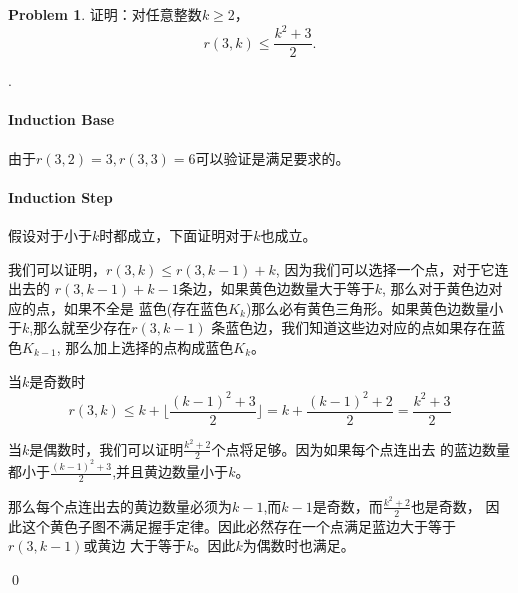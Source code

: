 \documentclass[UTF8]{ctexart}
\newenvironment{sol}
  {\par\vspace{3mm}\noindent{\it Solution}.}
  {\qed \\ \medskip}
\theoremstyle{definition}
\newtheorem{problem}{Problem}
\begin{document}
\begin{problem}
证明：对任意整数$k \geq 2$，
\[
r(3, k) \leq \frac{k^2+3}{2}.
\]
\begin{sol}
  \paragraph{Induction Base} 由于$r(3,2)=3,r(3,3)=6$可以验证是满足要求的。
  \paragraph{Induction Step} 假设对于小于$k$时都成立，下面证明对于$k$也成立。

  我们可以证明，$r(3,k)\leq r(3,k-1)+k$, 因为我们可以选择一个点，对于它连出去的
  $r(3,k-1)+k-1$条边，如果黄色边数量大于等于$k$, 那么对于黄色边对应的点，如果不全是
  蓝色(存在蓝色$K_k$)那么必有黄色三角形。如果黄色边数量小于$k$,那么就至少存在$r(3,k-1)$
  条蓝色边，我们知道这些边对应的点如果存在蓝色$K_{k-1}$, 那么加上选择的点构成蓝色$K_k$。

  当$k$是奇数时
  $$
  r(3,k)\leq k + \lfloor\frac {(k-1)^2+3}2\rfloor =
  k+\frac{(k-1)^2+2}2=\frac{k^2+3}{2}
  $$

  当$k$是偶数时，我们可以证明$\frac {k^2+2} {2}$个点将足够。因为如果每个点连出去
  的蓝边数量都小于$\frac {(k-1)^2+3} 2$,并且黄边数量小于$k$。

  那么每个点连出去的黄边数量必须为$k-1$,而$k-1$是奇数，而$\frac {k^2+2}2$也是奇数，
  因此这个黄色子图不满足握手定律。因此必然存在一个点满足蓝边大于等于$r(3,k-1)$或黄边
  大于等于$k$。因此$k$为偶数时也满足。
  
\end{sol}
\end{problem}
\end{document}
